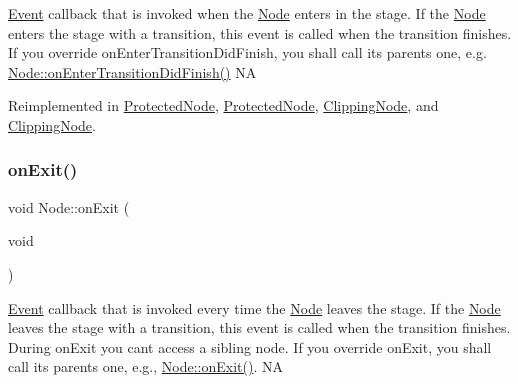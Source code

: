 \hyperlink{classEvent}{Event} callback that is invoked when the \hyperlink{classNode}{Node} enters in the \textquotesingle{}stage\textquotesingle{}. If the \hyperlink{classNode}{Node} enters the \textquotesingle{}stage\textquotesingle{} with a transition, this event is called when the transition finishes. If you override on\+Enter\+Transition\+Did\+Finish, you shall call its parent\textquotesingle{}s one, e.\+g. \hyperlink{classNode_afef4b2a863042a9ea456e952cf26991d}{Node\+::on\+Enter\+Transition\+Did\+Finish()}  NA 

Reimplemented in \hyperlink{classProtectedNode_aac8fcdaf79295aa56c9b792d2e4135d6}{Protected\+Node}, \hyperlink{classProtectedNode_ab424c044446f8c5cf2018e450c4df78c}{Protected\+Node}, \hyperlink{classClippingNode_ae083ddde34231495277586c7a8384262}{Clipping\+Node}, and \hyperlink{classClippingNode_a927d837090ada4bcdc8cedd40ef859f1}{Clipping\+Node}.

\mbox{\label{classNode_ac83de835ea315e3179d4293acd8903ac}} 
\subsubsection{\texorpdfstring{on\+Exit()}{onExit()}\hspace{0.1cm}{\footnotesize\ttfamily [1/2]}}
{\footnotesize\ttfamily void Node\+::on\+Exit (\begin{DoxyParamCaption}\item[{void}]{ }\end{DoxyParamCaption})\hspace{0.3cm}{\ttfamily [virtual]}}

\hyperlink{classEvent}{Event} callback that is invoked every time the \hyperlink{classNode}{Node} leaves the \textquotesingle{}stage\textquotesingle{}. If the \hyperlink{classNode}{Node} leaves the \textquotesingle{}stage\textquotesingle{} with a transition, this event is called when the transition finishes. During on\+Exit you can\textquotesingle{}t access a sibling node. If you override on\+Exit, you shall call its parent\textquotesingle{}s one, e.\+g., \hyperlink{classNode_ac83de835ea315e3179d4293acd8903ac}{Node\+::on\+Exit()}.  NA 

